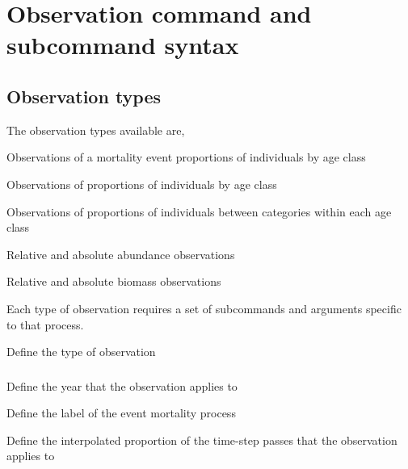 \section{Observation command and subcommand syntax\label{sec:observation-syntax}}

\subsection{Observation types}

The observation types available are,

\begin{description}
  \item Observations of a mortality event proportions of individuals by age class
  \item Observations of proportions of individuals by age class
  \item Observations of proportions of individuals between categories within each age class
  \item Relative and absolute abundance observations
  \item Relative and absolute biomass observations
\end{description}

Each type of observation requires a set of subcommands and arguments specific to that process.


 {Define the type of observation}

\subsubsection[Event mortality-at-age]{}

 {Define the year that the observation applies to}

 {Define the label of the event mortality process}

 {Define the interpolated proportion of the time-step passes that the observation applies to}

